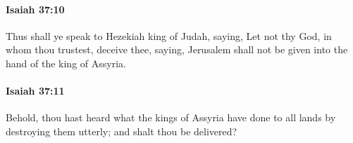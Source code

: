 		\paragraph{Isaiah 37:10} %
			\label{ISAIAH-37-10}

			Thus shall ye speak to Hezekiah king of Judah, saying, Let not thy God, in whom thou trustest, deceive thee, saying, Jerusalem shall not be given into the hand of the king of Assyria.


		\paragraph{Isaiah 37:11} %
			\label{ISAIAH-37-11}

			Behold, thou hast heard what the kings of Assyria have done to all lands by destroying them utterly; and shalt thou be delivered?


